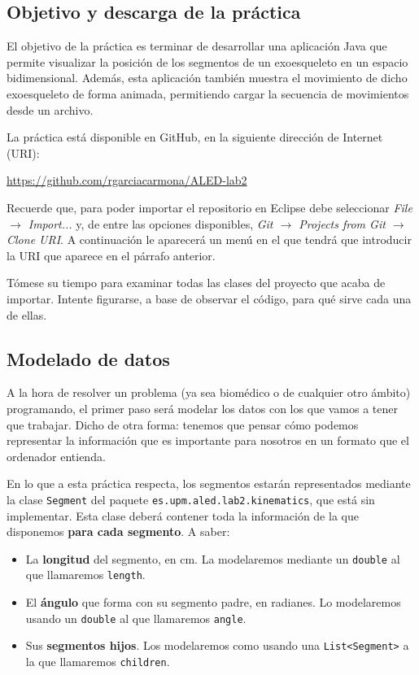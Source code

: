 \documentclass[10pt,a4paper,spanish]{article}
\newcommand{\code}[1]{\texttt{#1}}
\begin{document}
\subsection{Objetivo y descarga de la práctica}

El objetivo de la práctica es terminar de desarrollar una aplicación Java que permite visualizar la posición de los segmentos de un exoesqueleto en un espacio bidimensional. Además, esta aplicación también muestra el movimiento de dicho exoesqueleto de forma animada, permitiendo cargar la secuencia de movimientos desde un archivo.

La práctica está disponible en GitHub, en la siguiente dirección de Internet (URI):

\href{https://github.com/rgarciacarmona/ALED-lab2}{https://github.com/rgarciacarmona/ALED-lab2}

Recuerde que, para poder importar el repositorio en Eclipse debe seleccionar \textit{File $\to$ Import...} y, de entre las opciones disponibles, \textit{Git $\to$ Projects from Git $\to$ Clone URI}. A continuación le aparecerá un menú en el que tendrá que introducir la URI que aparece en el párrafo anterior.

Tómese su tiempo para examinar todas las clases del proyecto que acaba de importar. Intente figurarse, a base de observar el código, para qué sirve cada una de ellas.

\subsection{Modelado de datos}

A la hora de resolver un problema (ya sea biomédico o de cualquier otro ámbito) programando, el primer paso será modelar los datos con los que vamos a tener que trabajar. Dicho de otra forma: tenemos que pensar cómo podemos representar la información que es importante para nosotros en un formato que el ordenador entienda.

En lo que a esta práctica respecta, los segmentos estarán representados mediante la clase \code{Segment} del paquete \code{es.upm.aled.lab2.kinematics}, que está sin implementar. Esta clase deberá contener toda la información de la que disponemos \textbf{para cada segmento}. A saber:

\begin{itemize}
    \item La \textbf{longitud} del segmento, en cm. La modelaremos mediante un \code{double} al que llamaremos \code{length}.
    \item El \textbf{ángulo} que forma con su segmento padre, en radianes. Lo modelaremos usando un \code{double} al que llamaremos \code{angle}.
    \item Sus \textbf{segmentos hijos}. Los modelaremos como usando una \code{List<Segment>} a la que llamaremos \code{children}.
\end{itemize}
\end{document}
